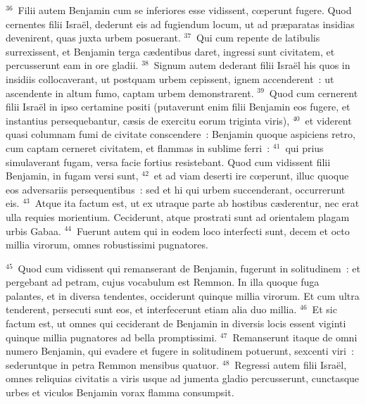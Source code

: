 ${}^{36}$~Filii autem Benjamin cum se inferiores esse vidissent, cœperunt fugere. Quod cernentes filii Isra\"el, dederunt eis ad fugiendum locum, ut ad pr\ae paratas insidias devenirent, quas juxta urbem posuerant.
${}^{37}$~Qui cum repente de latibulis surrexissent, et Benjamin terga c\ae dentibus daret, ingressi sunt civitatem, et percusserunt eam in ore gladii.
${}^{38}$~Signum autem dederant filii Isra\"el his quos in insidiis collocaverant, ut postquam urbem cepissent, ignem accenderent~: ut ascendente in altum fumo, captam urbem demonstrarent.
${}^{39}$~Quod cum cernerent filii Isra\"el in ipso certamine positi (putaverunt enim filii Benjamin eos fugere, et instantius persequebantur, c\ae sis de exercitu eorum triginta viris),
${}^{40}$~et viderent quasi columnam fumi de civitate conscendere~: Benjamin quoque aspiciens retro, cum captam cerneret civitatem, et flammas in sublime ferri~:
${}^{41}$~qui prius simulaverant fugam, versa facie fortius resistebant. Quod cum vidissent filii Benjamin, in fugam versi sunt,
${}^{42}$~et ad viam deserti ire cœperunt, illuc quoque eos adversariis persequentibus~: sed et hi qui urbem succenderant, occurrerunt eis.
${}^{43}$~Atque ita factum est, ut ex utraque parte ab hostibus c\ae derentur, nec erat ulla requies morientium. Ceciderunt, atque prostrati sunt ad orientalem plagam urbis Gabaa.
${}^{44}$~Fuerunt autem qui in eodem loco interfecti sunt, decem et octo millia virorum, omnes robustissimi pugnatores.


${}^{45}$~Quod cum vidissent qui remanserant de Benjamin, fugerunt in solitudinem~: et pergebant ad petram, cujus vocabulum est Remmon. In illa quoque fuga palantes, et in diversa tendentes, occiderunt quinque millia virorum. Et cum ultra tenderent, persecuti sunt eos, et interfecerunt etiam alia duo millia.
${}^{46}$~Et sic factum est, ut omnes qui ceciderant de Benjamin in diversis locis essent viginti quinque millia pugnatores ad bella promptissimi.
${}^{47}$~Remanserunt itaque de omni numero Benjamin, qui evadere et fugere in solitudinem potuerunt, sexcenti viri~: sederuntque in petra Remmon mensibus quatuor.
${}^{48}$~Regressi autem filii Isra\"el, omnes reliquias civitatis a viris usque ad jumenta gladio percusserunt, cunctasque urbes et viculos Benjamin vorax flamma consumpsit.

